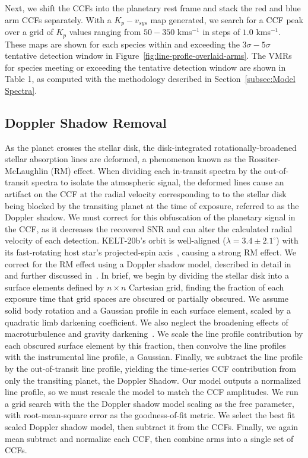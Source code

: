 \documentclass[twocolumn]{aastex631}
\begin{document}
            Next, we shift the CCFs into the planetary rest frame and stack the red and blue arm CCFs separately. With a ${K_p-v_{sys}}$ map generated, we search for a CCF peak over a grid of $K_p$ values ranging from $50-350$ kms$^{-1}$ in steps of $1.0$ kms$^{-1}$. These maps are shown for each species within and exceeding the ${3\sigma}-{5\sigma}$ tentative detection window in Figure~\ref{fig:line-profle-overlaid-arms}. The VMRs for species meeting or exceeding the tentative detection window are shown in Table 1, as computed with the methodology described in Section~\ref{subsec:Model Spectra}.

        \subsection{Doppler Shadow Removal}
            As the planet crosses the stellar disk, the disk-integrated rotationally-broadened stellar absorption lines are deformed, a phenomenon known as the Rossiter-McLaughlin (RM) effect. When dividing each in-transit spectra by the out-of-transit spectra to isolate the atmospheric signal, the deformed lines cause an artifact on the CCF at the radial velocity corresponding to to the stellar disk being blocked by the transiting planet at the time of exposure, referred to as the Doppler shadow. We must correct for this obfuscation of the planetary signal in the CCF, as it decreases the recovered SNR and can alter the calculated radial velocity of each detection. KELT-20b's orbit is well-aligned ($\lambda = 3.4 \pm 2.1 ^{\circ}$) with its fast-rotating host star's projected-spin axis~\citep{Lund2017}, causing a strong RM effect. We correct for the RM effect using a Doppler shadow model, described in detail in~\citep{Johnson2016} and further discussed in~\citep{Johnson2014, Johnson2017}. In brief, we begin by dividing the stellar disk into a surface elements defined by $n \times n$ Cartesian grid, finding the fraction of each exposure time that grid spaces are obscured or partially obscured. We assume solid body rotation and a Gaussian profile in each surface element, scaled by a quadratic limb darkening coefficient. We also neglect the broadening effects of macroturbulence and gravity darkening~\citet{Johnson2016}. We scale the line profile contribution by each obscured surface element by this fraction, then convolve the line profiles with the instrumental line profile, a Gaussian. Finally, we subtract the line profile by the out-of-transit line profile, yielding the time-series CCF contribution from only the transiting planet, the Doppler Shadow. Our model outputs a normalized line profile, so we must rescale the model to match the CCF amplitudes. We run a grid search with the the Doppler shadow model scaling as the free parameter, with root-mean-square error as the goodness-of-fit metric. We select the best fit scaled Doppler shadow model, then subtract it from the CCFs. Finally, we again mean subtract and normalize each CCF, then combine arms into a single set of CCFs.
            
\end{document}
